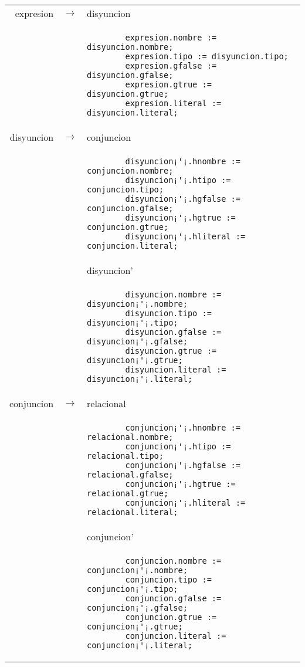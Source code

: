 \small
\begin{tabular}{r c p{}}

			expresion			& $\longrightarrow$ 	& disyuncion \\
								&					& \begin{lstlisting}
        expresion.nombre := disyuncion.nombre;
        expresion.tipo := disyuncion.tipo;
        expresion.gfalse := disyuncion.gfalse;
        expresion.gtrue := disyuncion.gtrue;
        expresion.literal := disyuncion.literal;
                    									\end{lstlisting} \\

			disyuncion			& $\longrightarrow$ 	& conjuncion \\
								&					& \begin{lstlisting}
		disyuncion¡'¡.hnombre := conjuncion.nombre;
        disyuncion¡'¡.htipo := conjuncion.tipo;
        disyuncion¡'¡.hgfalse := conjuncion.gfalse;
        disyuncion¡'¡.hgtrue := conjuncion.gtrue;
        disyuncion¡'¡.hliteral := conjuncion.literal;
                    									\end{lstlisting} \\
								&					& disyuncion' \\
								&					& \begin{lstlisting}
		disyuncion.nombre := disyuncion¡'¡.nombre;
        disyuncion.tipo := disyuncion¡'¡.tipo;
        disyuncion.gfalse := disyuncion¡'¡.gfalse;
        disyuncion.gtrue := disyuncion¡'¡.gtrue;
        disyuncion.literal := disyuncion¡'¡.literal;
                    									\end{lstlisting} \\
		
			conjuncion			& $\longrightarrow$ 	& relacional \\
								&					& \begin{lstlisting}
		conjuncion¡'¡.hnombre := relacional.nombre;
        conjuncion¡'¡.htipo := relacional.tipo;
        conjuncion¡'¡.hgfalse := relacional.gfalse;
        conjuncion¡'¡.hgtrue := relacional.gtrue;
        conjuncion¡'¡.hliteral := relacional.literal;
                    									\end{lstlisting} \\
								&					& conjuncion' \\
								&					& \begin{lstlisting}
		conjuncion.nombre := conjuncion¡'¡.nombre;
        conjuncion.tipo := conjuncion¡'¡.tipo;
        conjuncion.gfalse := conjuncion¡'¡.gfalse;
        conjuncion.gtrue := conjuncion¡'¡.gtrue;
        conjuncion.literal := conjuncion¡'¡.literal;
                    									\end{lstlisting} \\
\end{tabular}


